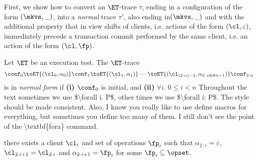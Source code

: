 First, we show how to convert an $\ET$-trace $\tau$, ending in a configuration of the form $(\mkvs, \_)$, 
into a \emph{normal} trace $\tau'$, also ending in$(\mkvs, \_)$ 
and with the additional property that in view shifts of clients, i.e. actions of the form $(\cl, \varepsilon)$, 
immediately precede a transaction commit performed by the same client, i.e. an action of the form $(\cl, \fp)$. 
\begin{definition}
Let $\ET$ be an execution test. The $\ET$-trace
\[
\conf_0 \toET{(\cl_{0}, \alpha_0)} \conf_1 \toET{(\cl_1, \alpha_1)} \cdots \toET{(\cl_{(2\cdot n) - 1}, \alpha_{2\ cdot n - 1})} \conf_{2 \cdot n}
\]
is in \emph{normal form} if \textbf{(i)} $\conf_0$ is initial, and 
\textbf{(ii)} $\forall  i.\; 0 \leq i < n$ 
\ac{Throughout the text sometimes we use $\forall i. P$, other times we use $\forall i: P$. The style should be 
made consistent. Also, I know you really like to use define macros for everything, but sometimes you define too 
many of them. I still don't see the point of the \textbf{fora} command.}

there exists a client $\cl_i$ and set of operations $\fp_{i}$ such that 
$\alpha_{2 \cdot i} = \varepsilon$, $\cl_{2 \cdot i + 1} = \cl_{2 \cdot i}$ and $\alpha_{2 \cdot i + 1} = \fp_{i}$ for some $\fp_{i} \subseteq \opset$.
\end{definition}


